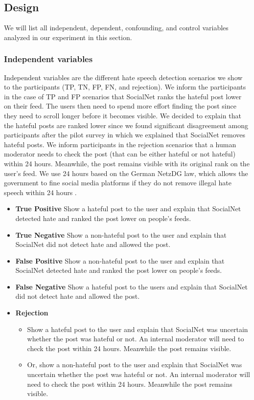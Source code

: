 \subsection{Design}
We will list all independent, dependent, confounding, and control variables analyzed in our experiment in this section.

\subsubsection{Independent variables}
Independent variables are the different hate speech detection scenarios we show to the participants (TP, TN, FP, FN, and rejection).
%
We inform the participants in the case of TP and FP scenarios that SocialNet ranks the hateful post lower on their feed.
%
The users then need to spend more effort finding the post since they need to scroll longer before it becomes visible.
%
We decided to explain that the hateful posts are ranked lower since we found significant disagreement among participants after the pilot survey in which we explained that SocialNet removes hateful posts.
%
We inform participants in the rejection scenarios that a human moderator needs to check the post (that can be either hateful or not hateful) within 24 hours.
%
Meanwhile, the post remains visible with its original rank on the user's feed.
%
We use 24 hours based on the German NetzDG law, which allows the government to fine social media platforms if they do not remove illegal hate speech within 24 hours \citep{tworek2019analysis}.
%
\begin{itemize}
    \item \textbf{True Positive} Show a hateful post to the user and explain that SocialNet detected hate and ranked the post lower on people's feeds.
    \item \textbf{True Negative} Show a non-hateful post to the user and explain that SocialNet did not detect hate and allowed the post.
    \item \textbf{False Positive} Show a non-hateful post to the user and explain that SocialNet detected hate and ranked the post lower on people's feeds.
    \item \textbf{False Negative} Show a hateful post to the users and explain that SocialNet did not detect hate and allowed the post.
    \item \textbf{Rejection}
          \begin{itemize}
              \item Show a hateful post to the user and explain that SocialNet was uncertain whether the post was hateful or not. An internal moderator will need to check the post within 24 hours. Meanwhile the post remains visible.
              \item Or, show a non-hateful post to the user and explain that SocialNet was uncertain whether the post was hateful or not. An internal moderator will need to check the post within 24 hours. Meanwhile the post remains visible.
          \end{itemize}
\end{itemize}

